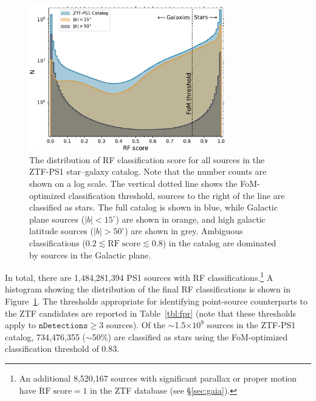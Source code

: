 \documentclass[twocolumn]{aastex62}
\begin{document}
\begin{CJK*}{UTF8}{gbsn}
\begin{figure}[htb]
 \centering
  \includegraphics[width=3.35in]{./Figures/ZTF_PS1_cat_hist.pdf}
  \caption{ The distribution of RF classification score for all sources in
  the ZTF-PS1 star--galaxy catalog. Note that the number counts are shown on
  a log scale. The vertical dotted line shows the FoM-optimized
  classification threshold, sources to the right of the line are classified
  as stars. The full catalog is shown in blue, while Galactic plane sources
  ($|b| < 15^{\circ}$) are shown in orange, and high galactic latitude
  sources ($|b| > 50^{\circ}$) are shown in grey. Ambiguous classifications
  ($0.2 \lesssim \mathrm{RF\;score} \lesssim 0.8$) in the catalog are
  dominated by sources in the Galactic plane.}
  \label{fig:ztf_hist}
\end{figure}

In total, there are 1,484,281,394 PS1 sources with RF
classifications.\footnote{An additional 8,520,167 sources with
significant parallax or proper motion have $\mathrm{RF\;score} = 1$ in the
ZTF database (see \S\ref{sec:gaia}).} A histogram showing the distribution
of the final RF classifications is shown in Figure~\ref{fig:ztf_hist}. The
thresholds appropriate for identifying point-source counterparts to the ZTF
candidates are reported in Table~\ref{tbl:fpr} (note that these thresholds
apply to $\mathtt{nDetections} \ge 3$ sources). Of the $\sim$1.5$\times
10^{9}$ sources in the ZTF-PS1 catalog, 734,476,355 ($\sim$50\%) are
classified as stars using the FoM-optimized classification threshold of 0.83.


\end{CJK*}
\end{document}
